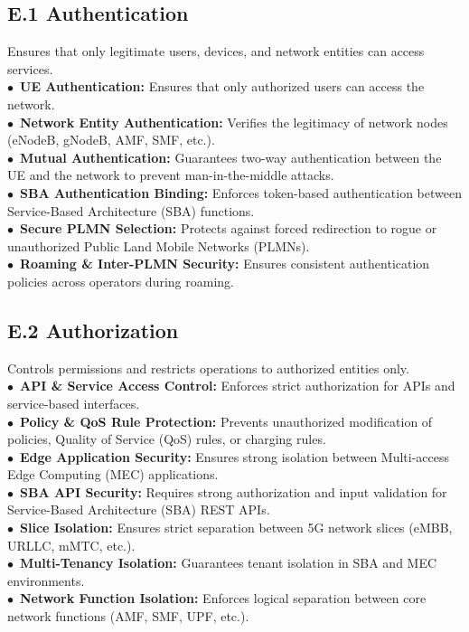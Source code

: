 \documentclass[sigconf]{acmart}
\begin{document}
{\subsection*{E.1 Authentication}
Ensures that only legitimate users, devices, and network entities can access services. \\
\noindent$\bullet$~\textbf{UE Authentication:} Ensures that only authorized users can access the network. \\ 
\noindent$\bullet$~\textbf{Network Entity Authentication:} Verifies the legitimacy of network nodes (eNodeB, gNodeB, AMF, SMF, etc.).  \\
\noindent$\bullet$~\textbf{Mutual Authentication:} Guarantees two-way authentication between the UE and the network to prevent man-in-the-middle attacks.  \\
\noindent$\bullet$~\textbf{SBA Authentication Binding:} Enforces token-based authentication between Service-Based Architecture (SBA) functions.  \\
\noindent$\bullet$~\textbf{Secure PLMN Selection:} Protects against forced redirection to rogue or unauthorized Public Land Mobile Networks (PLMNs).  \\
\noindent$\bullet$~\textbf{Roaming \& Inter-PLMN Security:} Ensures consistent authentication policies across operators during roaming.  


\subsection*{E.2 Authorization}
Controls permissions and restricts operations to authorized entities only. \\
\noindent$\bullet$~\textbf{API \& Service Access Control:} Enforces strict authorization for APIs and service-based interfaces.  \\
\noindent$\bullet$~\textbf{Policy \& QoS Rule Protection:} Prevents unauthorized modification of policies, Quality of Service (QoS) rules, or charging rules.  \\
\noindent$\bullet$~\textbf{Edge Application Security:} Ensures strong isolation between Multi-access Edge Computing (MEC) applications.  \\
\noindent$\bullet$~\textbf{SBA API Security:} Requires strong authorization and input validation for Service-Based Architecture (SBA) REST APIs.  \\
\noindent$\bullet$~\textbf{Slice Isolation:} Ensures strict separation between 5G network slices (eMBB, URLLC, mMTC, etc.).  \\
\noindent$\bullet$~\textbf{Multi-Tenancy Isolation:} Guarantees tenant isolation in SBA and MEC environments.  \\
\noindent$\bullet$~\textbf{Network Function Isolation:} Enforces logical separation between core network functions (AMF, SMF, UPF, etc.).  \\


}
\end{document}
